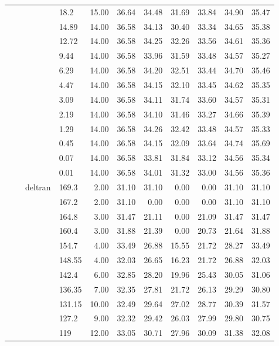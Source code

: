 \begin{longtable}{llllrrrrrrr}
   &  &  & 18.2 & 15.00 & 36.64 & 34.48 & 31.69 & 33.84 & 34.90 & 35.47 \\ 
   &  &  & 14.89 & 14.00 & 36.58 & 34.13 & 30.40 & 33.34 & 34.65 & 35.38 \\ 
   &  &  & 12.72 & 14.00 & 36.58 & 34.25 & 32.26 & 33.56 & 34.61 & 35.36 \\ 
   &  &  & 9.44 & 14.00 & 36.58 & 33.96 & 31.59 & 33.48 & 34.57 & 35.27 \\ 
   &  &  & 6.29 & 14.00 & 36.58 & 34.20 & 32.51 & 33.44 & 34.70 & 35.46 \\ 
   &  &  & 4.47 & 14.00 & 36.58 & 34.15 & 32.10 & 33.45 & 34.62 & 35.35 \\ 
   &  &  & 3.09 & 14.00 & 36.58 & 34.11 & 31.74 & 33.60 & 34.57 & 35.31 \\ 
   &  &  & 2.19 & 14.00 & 36.58 & 34.10 & 31.46 & 33.27 & 34.66 & 35.39 \\ 
   &  &  & 1.29 & 14.00 & 36.58 & 34.26 & 32.42 & 33.48 & 34.57 & 35.33 \\ 
   &  &  & 0.45 & 14.00 & 36.58 & 34.15 & 32.09 & 33.64 & 34.74 & 35.69 \\ 
   &  &  & 0.07 & 14.00 & 36.58 & 33.81 & 31.84 & 33.12 & 34.56 & 35.34 \\ 
   &  &  & 0.01 & 14.00 & 36.58 & 34.01 & 31.32 & 33.00 & 34.56 & 35.36 \\ 
   &  & deltran & 169.3 & 2.00 & 31.10 & 31.10 & 0.00 & 0.00 & 31.10 & 31.10 \\ 
   &  &  & 167.2 & 2.00 & 31.10 & 0.00 & 0.00 & 0.00 & 31.10 & 31.10 \\ 
   &  &  & 164.8 & 3.00 & 31.47 & 21.11 & 0.00 & 21.09 & 31.47 & 31.47 \\ 
   &  &  & 160.4 & 3.00 & 31.88 & 21.39 & 0.00 & 20.73 & 21.64 & 31.88 \\ 
   &  &  & 154.7 & 4.00 & 33.49 & 26.88 & 15.55 & 21.72 & 28.27 & 33.49 \\ 
   &  &  & 148.55 & 4.00 & 32.03 & 26.65 & 16.23 & 21.72 & 26.88 & 32.03 \\ 
   &  &  & 142.4 & 6.00 & 32.85 & 28.20 & 19.96 & 25.43 & 30.05 & 31.06 \\ 
   &  &  & 136.35 & 7.00 & 32.35 & 27.81 & 21.72 & 26.13 & 29.29 & 30.80 \\ 
   &  &  & 131.15 & 10.00 & 32.49 & 29.64 & 27.02 & 28.77 & 30.39 & 31.57 \\ 
   &  &  & 127.2 & 9.00 & 32.32 & 29.42 & 26.03 & 27.99 & 29.80 & 30.75 \\ 
   &  &  & 119 & 12.00 & 33.05 & 30.71 & 27.96 & 30.09 & 31.38 & 32.08 \\ 

\end{longtable}
